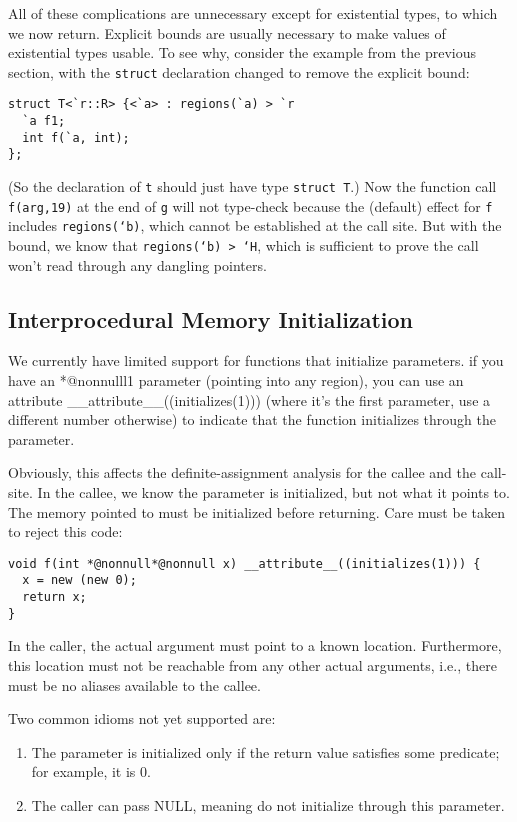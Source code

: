 All of these complications are unnecessary except for existential
types, to which we now return.  Explicit bounds are usually necessary
to make values of existential types usable.  To see why, consider the
example from the previous section, with the \texttt{struct}
declaration changed to remove the explicit bound:
\begin{verbatim}  
struct T<`r::R> {<`a> : regions(`a) > `r 
  `a f1; 
  int f(`a, int); 
};
\end{verbatim}
(So the declaration of \texttt{t} should just have type \texttt{struct
  T}.)  Now the function call \texttt{f(arg,19)} at the end of
\texttt{g} will not type-check because the (default) effect for
\texttt{f} includes \texttt{regions(`b)}, which cannot be established
at the call site.  But with the bound, we know that
  \texttt{regions(`b) > `H}, which is sufficient to prove the call
  won't read through any dangling pointers.

\subsection{Interprocedural Memory Initialization}

We currently have limited support for functions that initialize
parameters.  if you have an *@nonnulll{1} parameter (pointing into any region),
you can use an attribute __attribute__((initializes(1))) (where it's
the first parameter, use a different number otherwise) to indicate
that the function initializes through the parameter.
        
Obviously, this affects the definite-assignment analysis for the
callee and the call-site.  In the callee, we know the parameter is
initialized, but not what it points to.  The memory pointed to must be
initialized before returning.  Care must be taken to reject this code:
\begin{verbatim}
void f(int *@nonnull*@nonnull x) __attribute__((initializes(1))) { 
  x = new (new 0); 
  return x; 
}
\end{verbatim}
In the caller, the actual argument must point to a known location.
Furthermore, this location must not be reachable from any other actual
arguments, i.e., there must be no aliases available to the callee.

Two common idioms not yet supported are: 
\begin{enumerate}
\item The parameter is
initialized only if the return value satisfies some predicate; for
example, it is 0.
\item The caller can pass NULL, meaning do not initialize through this
  parameter.
\end{enumerate}
